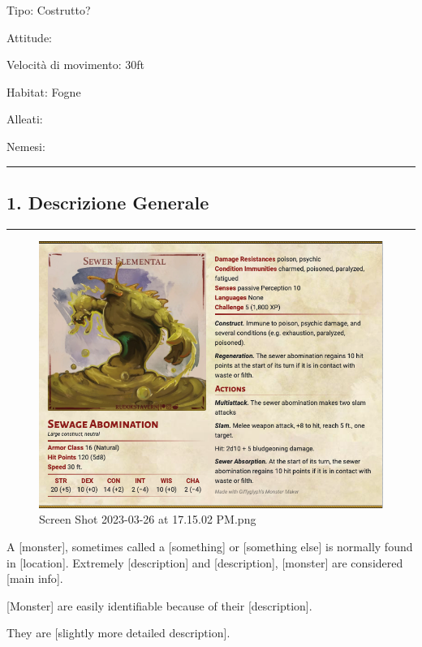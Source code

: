 Tipo: Costrutto?

Attitude:

Velocità di movimento: 30ft

Habitat: Fogne

Alleati:

Nemesi:

\begin{center}\rule{0.5\linewidth}{0.5pt}\end{center}

\subsection{1. Descrizione Generale}\label{descrizione-generale}

\begin{center}\rule{0.5\linewidth}{0.5pt}\end{center}

\begin{figure}
\centering
\includegraphics{Screen_Shot_2023-03-26_at_17.15.02_PM.png}
\caption{Screen Shot 2023-03-26 at 17.15.02 PM.png}
\end{figure}

A {[}monster{]}, sometimes called a {[}something{]} or {[}something
else{]} is normally found in {[}location{]}. Extremely {[}description{]}
and {[}description{]}, {[}monster{]} are considered {[}main info{]}.

{[}Monster{]} are easily identifiable because of their
{[}description{]}.

They are {[}slightly more detailed description{]}.

